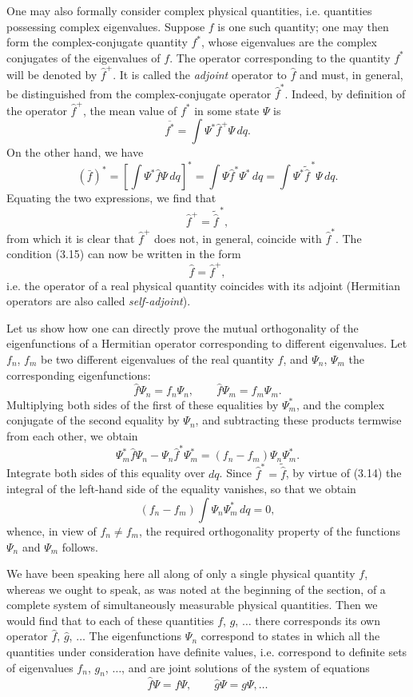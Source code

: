 One may also formally consider complex physical quantities,
i.e. quantities possessing complex eigenvalues. Suppose $f$ is one such
quantity; one may then form the complex-conjugate quantity $f^*$, whose eigenvalues are the
complex conjugates of the eigenvalues of $f$. The operator corresponding to the
quantity $f^*$ will be denoted by $\hat f^+$. It is called the \emph{adjoint}
operator to $\hat f$ and must, in general, be distinguished from the
complex-conjugate operator $\hat f^*$. Indeed, by definition of the operator
$\hat f^+$, the mean value of $f^*$ in some state $\Psi$ is
\[
  \overline{f^*}=\int \Psi^*\hat f^+\Psi\,dq.
\]
On the other hand, we have
\[
  {\left(\bar f\right)}^*
  = {\left[\int \Psi^*\hat f\Psi\,dq\right]}^*
  = \int \Psi\hat f^*\Psi^*\,dq
  = \int \Psi^*\tilde{\hat f}^{\,*}\Psi\,dq.
\]
Equating the two expressions, we find that
\begin{equation}
  \hat f^+=\tilde{\hat f}^{\,*},
  \tag{3.16}
\end{equation}
from which it is clear that $\hat f^+$ does not, in general, coincide with
$\hat f^*$. The condition (3.15) can now be written in the form
\begin{equation}
  \hat f=\hat f^+,
  \tag{3.17}
\end{equation}
i.e. the operator of a real physical quantity coincides with its adjoint
(Hermitian operators are also called \emph{self-adjoint}).

Let us show how one can directly prove the mutual orthogonality of the
eigenfunctions of a Hermitian operator corresponding to different eigenvalues.
Let $f_n$, $f_m$ be two different eigenvalues of the real quantity $f$, and
$\Psi_n$, $\Psi_m$ the corresponding eigenfunctions:
\[
  \hat f\Psi_n=f_n\Psi_n,
  \qquad
  \hat f\Psi_m=f_m\Psi_m.
\]
Multiplying both sides of the first of these equalities by $\Psi_m^*$, and the
complex conjugate of the second equality by $\Psi_n$, and subtracting these
products termwise from each other, we obtain
\[
  \Psi_m^*\hat f\Psi_n-\Psi_n\hat f^*\Psi_m^*
  =(f_n-f_m)\Psi_n\Psi_m^*.
\]
Integrate both sides of this equality over $dq$. Since
$\hat f^*=\tilde{\hat f}$, by virtue of (3.14) the integral of the left-hand
side of the equality vanishes, so that we obtain
\[
  (f_n-f_m)\int\Psi_n\Psi_m^*\,dq=0,
\]
whence, in view of $f_n\ne f_m$, the required orthogonality property of the
functions $\Psi_n$ and $\Psi_m$ follows.

We have been speaking here all along of only a single physical quantity $f$,
whereas we ought to speak, as was noted at the beginning of the section, of a
complete system of simultaneously measurable physical quantities. Then we would
find that to each of these quantities $f$, $g$, $\ldots$ there corresponds its
own operator $\hat f$, $\hat g$, $\ldots$ The eigenfunctions $\Psi_n$
correspond to states in which all the quantities under consideration have
definite values, i.e. correspond to definite sets of eigenvalues
$f_n$, $g_n$, $\ldots$, and are joint solutions of the system of equations
\[
  \hat f\Psi=f\Psi,
  \qquad
  \hat g\Psi=g\Psi,
  \ldots
\]
